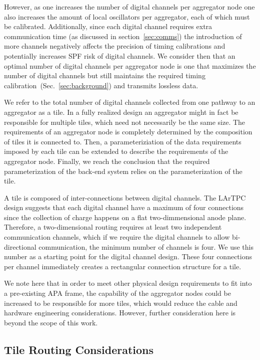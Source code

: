 However, as one increases the number of digital channels per aggregator node one also increases the amount of local oscillators per aggregator, each of which must be calibrated.
Additionally, since each digital channel requires extra communication time (as discussed in section~\ref{sec:comms}) the introduction of more channels negatively affects the precision of timing calibrations and potentially increases SPF risk of digital channels.
We consider then that an optimal number of digital channels per aggregator node is one that maximizes the number of digital channels but still maintains the required timing calibration~(Sec.~\ref{sec:background}) and transmits lossless data.

We refer to the total number of digital channels collected from one pathway to an aggregator as a tile.
In a fully realized design an aggregator might in fact be responsible for multiple tiles, which need not necessarily be the same size.
The requirements of an aggregator node is completely determined by the composition of tiles it is connected to.
Then, a parameteriziation of the data requirements imposed by each tile can be extended to describe the requirements of the aggregator node.
Finally, we reach the conclusion that the required parameterization of the back-end system relies on the parameterization of the tile.

A tile is composed of inter-connections between digital channels.
The LArTPC design suggests that each digital channel have a maximum of four connections since the collection of charge happens on a flat two-dimmensional anode plane.
Therefore, a two-dimensional routing requires at least two independent communication channels, which if we require the digital channels to allow bi-directional communication, the minimum number of channels is four.
We use this number as a starting point for the digital channel design.
These four connections per channel immediately creates a rectangular connection structure for a tile.

We note here that in order to meet other physical design requirements to fit into a pre-existing APA frame, the capability of the aggregator nodes could be increased to be responsible for more tiles, which would reduce the cable and hardware engineering considerations.
However, further consideration here is beyond the scope of this work.

\subsection{Tile Routing Considerations}

